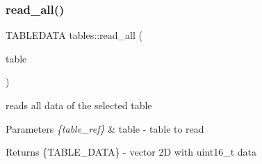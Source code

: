 \subsubsection{\texorpdfstring{read\+\_\+all()}{read\_all()}}
{\footnotesize\ttfamily T\+A\+B\+L\+E\+D\+A\+TA tables\+::read\+\_\+all (\begin{DoxyParamCaption}\item[{\hyperlink{structtable__ref}{table\+\_\+ref}}]{table }\end{DoxyParamCaption})}



reads all data of the selected table 


\begin{DoxyParams}{Parameters}
{\em \{table\+\_\+ref\}} & table -\/ table to read \\
\hline
\end{DoxyParams}
\begin{DoxyReturn}{Returns}
\{T\+A\+B\+L\+E\+\_\+\+D\+A\+TA\} -\/ vector 2D with uint16\+\_\+t data 
\end{DoxyReturn}
